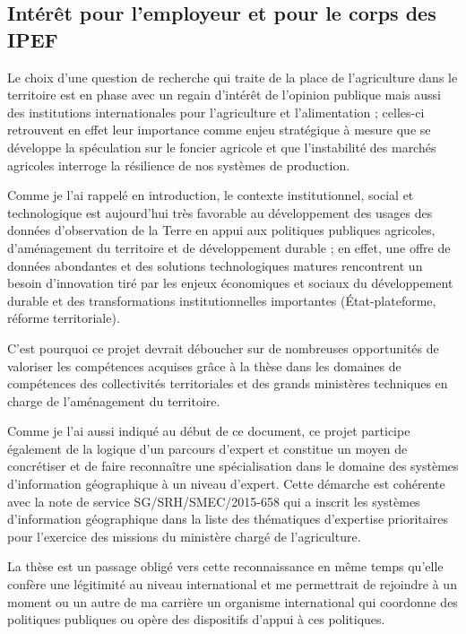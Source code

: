 \subsection
{Intérêt pour l'employeur et pour le corps des IPEF}

Le choix d'une question de recherche qui traite de la place de l'agriculture
dans le territoire est en phase avec un regain d'intérêt de l'opinion publique
mais aussi des institutions internationales pour l'agriculture et
l'alimentation ; celles-ci retrouvent en effet leur importance comme enjeu
stratégique à mesure que se développe la spéculation sur le foncier agricole
et que l'instabilité des marchés agricoles interroge la résilience de nos
systèmes de production.

Comme je l'ai rappelé en introduction, le contexte institutionnel, social et
technologique est aujourd'hui très favorable au développement des usages des
données d’observation de la Terre en appui aux politiques publiques agricoles,
d’aménagement du territoire et de développement durable ; en effet, une offre
de données abondantes et des solutions technologiques matures rencontrent un
besoin d'innovation tiré par les enjeux économiques et sociaux du
développement durable et des transformations institutionnelles importantes
(État-plateforme, réforme territoriale).

C'est pourquoi ce projet devrait déboucher sur de nombreuses opportunités de
valoriser les compétences acquises grâce à la thèse dans les domaines de
compétences des collectivités territoriales et des grands ministères
techniques en charge de l'aménagement du territoire.

Comme je l'ai aussi indiqué au début de ce document, ce projet participe
également de la logique d'un parcours d'expert et constitue un moyen de
concrétiser et de faire reconnaître une spécialisation dans le domaine des
systèmes d'information géographique à un niveau d'expert. Cette démarche est
cohérente avec la note de service SG/SRH/SMEC/2015-658 qui a inscrit les
systèmes d'information géographique dans la liste des thématiques d'expertise
prioritaires pour l'exercice des missions du ministère chargé de
l'agriculture.

La thèse est un passage obligé vers cette reconnaissance en même temps qu'elle
confère une légitimité au niveau international et me permettrait de rejoindre
à un moment ou un autre de ma carrière un organisme international qui
coordonne des politiques publiques ou opère des dispositifs d'appui à ces
politiques.

